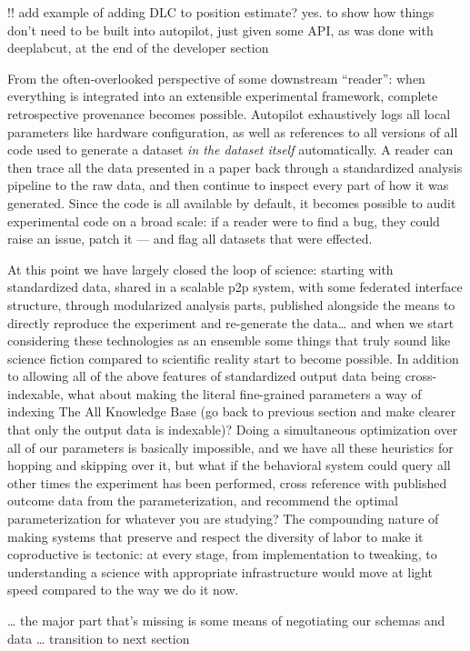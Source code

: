 \documentclass{article}
\begin{document}
!! add example of adding DLC to position estimate? yes. to show how
things don't need to be built into autopilot, just given some API, as
was done with deeplabcut, at the end of the developer section

From the often-overlooked perspective of some downstream ``reader'':
when everything is integrated into an extensible experimental framework,
complete retrospective provenance becomes possible. Autopilot
exhaustively logs all local parameters like hardware configuration, as
well as references to all versions of all code used to generate a
dataset \emph{in the dataset itself} automatically. A reader can then
trace all the data presented in a paper back through a standardized
analysis pipeline to the raw data, and then continue to inspect every
part of how it was generated. Since the code is all available by
default, it becomes possible to audit experimental code on a broad
scale: if a reader were to find a bug, they could raise an issue, patch
it --- and flag all datasets that were effected.

At this point we have largely closed the loop of science: starting with
standardized data, shared in a scalable p2p system, with some federated
interface structure, through modularized analysis parts, published
alongside the means to directly reproduce the experiment and re-generate
the data\ldots{} and when we start considering these technologies as an
ensemble some things that truly sound like science fiction compared to
scientific reality start to become possible. In addition to allowing all
of the above features of standardized output data being cross-indexable,
what about making the literal fine-grained parameters a way of indexing
The All Knowledge Base (go back to previous section and make clearer
that only the output data is indexable)? Doing a simultaneous
optimization over all of our parameters is basically impossible, and we
have all these heuristics for hopping and skipping over it, but what if
the behavioral system could query all other times the experiment has
been performed, cross reference with published outcome data from the
parameterization, and recommend the optimal parameterization for
whatever you are studying? The compounding nature of making systems that
preserve and respect the diversity of labor to make it coproductive is
tectonic: at every stage, from implementation to tweaking, to
understanding a science with appropriate infrastructure would move at
light speed compared to the way we do it now.

\ldots{} the major part that's missing is some means of negotiating our
schemas and data \ldots{} transition to next section
\end{document}
